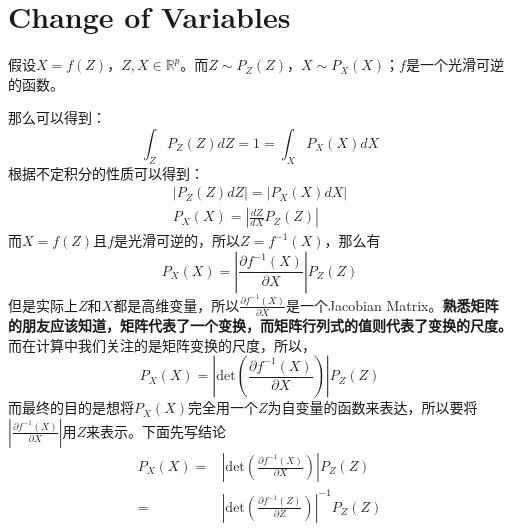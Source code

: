 \documentclass[a4paper]{article}
\begin{document}
\section{Change of Variables}
假设$X=f(Z)$，$Z,X\in \mathbb{R}^p$。而$Z\sim P_Z(Z)$，$X\sim P_X(X)$；$f$是一个光滑可逆的函数。

那么可以得到：
\begin{equation}
    \int_Z P_Z(Z) dZ = 1 = \int_X P_X(X) dX
\end{equation}
根据不定积分的性质可以得到：
\begin{gather}
    |P_Z(Z) dZ| = |P_X(X) dX| \\
    P_X(X) = \left| \frac{dZ}{dX} P_Z(Z) \right|
\end{gather}
而$X=f(Z)$且$f$是光滑可逆的，所以$Z = f^{-1}(X)$，那么有
\begin{equation}
    P_X(X) = \left| \frac{\partial f^{-1}(X)}{\partial X}  \right|P_Z(Z)
\end{equation}
但是实际上$Z$和$X$都是高维变量，所以$\frac{\partial f^{-1}(X)}{\partial X}$是一个Jacobian Matrix。\textbf{熟悉矩阵的朋友应该知道，矩阵代表了一个变换，而矩阵行列式的值则代表了变换的尺度。}而在计算中我们关注的是矩阵变换的尺度，所以，
\begin{equation}
    P_X(X) = \left| \text{det}\left( \frac{\partial f^{-1}(X)}{\partial X} \right)  \right|P_Z(Z)
\end{equation}
而最终的目的是想将$P_X(X)$完全用一个$Z$为自变量的函数来表达，所以要将$\left| \frac{\partial f^{-1}(X)}{\partial X} \right|$用$Z$来表示。下面先写结论
\begin{equation}
    \begin{split}
         P_X(X) = & \left| \text{det}\left( \frac{\partial f^{-1}(X)}{\partial X} \right)  \right|P_Z(Z) \\
         = & \left| \text{det}\left( \frac{\partial f^{-1}(Z)}{\partial Z} \right)  \right|^{-1}P_Z(Z)
    \end{split}
\end{equation}
\end{document}
